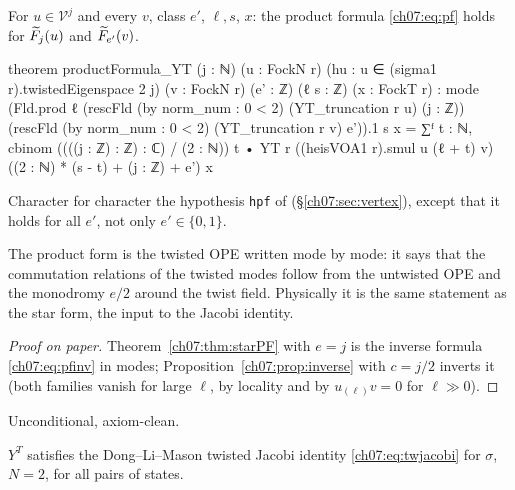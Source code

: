 \begin{theorem}\label{ch07:thm:productFormula}
For $u\in\mathcal V^j$ and every $v$, class $e'$, $\ell, s$, $x$: the product formula
\eqref{ch07:eq:pf} holds for $\widetilde{F}_j(u)$ and $\widetilde{F}_{e'}(v)$.
\end{theorem}

\begin{leancode}
theorem productFormula_YT (j : ℕ) (u : FockN r) (hu : u ∈ (sigma1 r).twistedEigenspace 2 j)
    (v : FockN r) (e' : ℤ) (ℓ s : ℤ) (x : FockT r) :
    mode (Fld.prod ℓ (rescFld (by norm_num : 0 < 2) (YT_truncation r u) (j : ℤ))
        (rescFld (by norm_num : 0 < 2) (YT_truncation r v) e')).1 s x
      = ∑ᶠ t : ℕ, cbinom ((((j : ℤ) : ℤ) : ℂ) / (2 : ℕ)) t •
          YT r ((heisVOA1 r).smul u (ℓ + t) v) ((2 : ℕ) * (s - t) + (j : ℤ) + e') x
\end{leancode}

\begin{dictionary}
Character for character the hypothesis \verb|hpf| of 
(\S\ref{ch07:sec:vertex}), except that it holds for all $e'$, not only $e'\in\{0,1\}$.
\end{dictionary}

\begin{physics}
The product form is the twisted OPE written mode by mode: it says that the commutation relations of the twisted modes follow from the untwisted OPE and the monodromy $e/2$ around the twist field. Physically it is the same statement as the star form, the input to the Jacobi identity.
\end{physics}

\begin{proof}[Proof on paper]
Theorem~\ref{ch07:thm:starPF} with $e = j$ is the inverse formula \eqref{ch07:eq:pfinv} in modes;
Proposition~\ref{ch07:prop:inverse} with $c = j/2$ inverts it (both families vanish for large
$\ell$, by locality and by $u_{(\ell)}v = 0$ for $\ell\gg0$).
\end{proof}

\begin{status}
Unconditional, axiom-clean.
\end{status}

\begin{theorem}\label{ch07:thm:jacobiYT}
$Y^T$ satisfies the Dong--Li--Mason twisted Jacobi identity \eqref{ch07:eq:twjacobi} for $\sigma$,
$N=2$, for all pairs of states.
\end{theorem}

